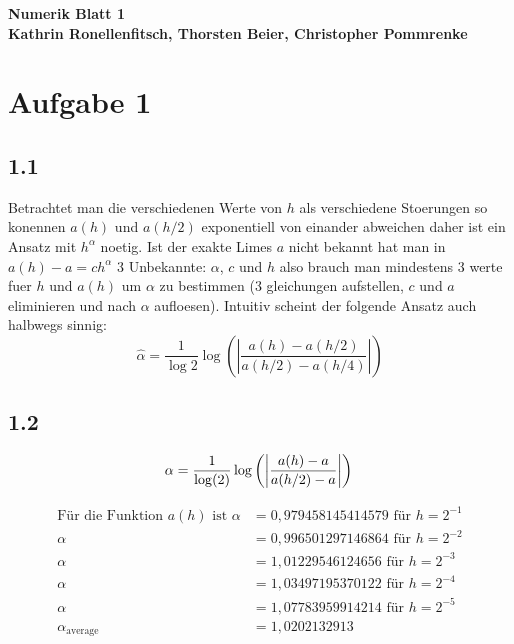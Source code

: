 \documentclass[10pt,oneside,a4paper]{scrartcl}
\begin{document}

	\begin{center}
		\huge %
		\bfseries %
		\sffamily %
		Numerik Blatt 1\\[1em]
		\normalsize
		Kathrin Ronellenfitsch, Thorsten Beier, Christopher Pommrenke
	\end{center}

	
	\section*{Aufgabe 1}
    \subsection*{1.1}
    Betrachtet man die verschiedenen Werte von $h$ als verschiedene Stoerungen
    so konennen  $a(h)$ und $a(h/2)$  exponentiell von einander abweichen daher
    ist ein Ansatz mit $h^{\alpha}$ noetig. Ist der exakte Limes $a$ nicht
    bekannt hat man  in $a(h)-a=ch^{\alpha}$ 3 Unbekannte: $\alpha$, $c$ und $h$
    also brauch man mindestens 3 werte fuer $h$ und $a(h)$ um $\alpha$ zu
    bestimmen (3 gleichungen aufstellen, $c$ und $a$ eliminieren und nach
    $\alpha$ aufloesen). Intuitiv scheint der folgende Ansatz auch halbwegs
    sinnig:
    \begin{equation*}
        \hat{\alpha}= \frac{1} { \log{2}} \log{\left( \left| \frac{a(h)-a(h/2)}{a(h/2)-a(h/4)}\right|\right) }
    \end{equation*} 

	\subsection*{1.2}

	\begin{equation*}
		\alpha = \frac{1}{\log(2)}\log \left( \left|\frac{a(h)-a}{a(h/2)-a}\right| \right)\\
	\end{equation*}

	\begin{align*}
		\text {Für die Funktion } a(h) \text { ist } \alpha &= 0,979458145414579 \text { für } h = 2^{-1} \\
		\alpha &= 0,996501297146864 \text { für } h = 2^{-2} \\
		\alpha &= 1,01229546124656 \text { für } h = 2^{-3} \\
		\alpha &= 1,03497195370122 \text { für } h = 2^{-4} \\
		\alpha &= 1,07783959914214 \text { für } h = 2^{-5} \\
		\alpha_{\text{average}} &= 1,0202132913
    \end{align*}
\end{document}
